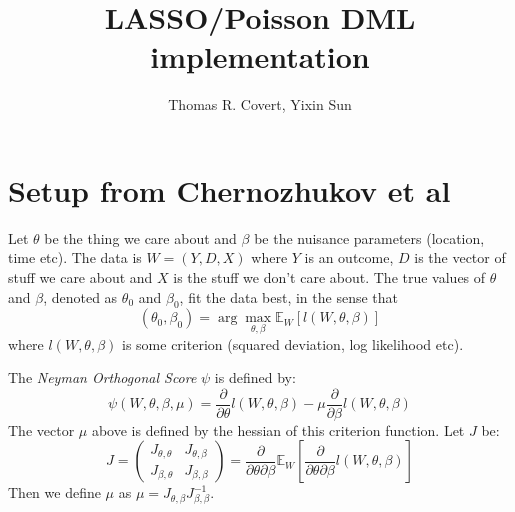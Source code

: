 \documentclass[11pt]{article}
\title{LASSO/Poisson DML implementation}
\author{Thomas R. Covert, Yixin Sun}
\begin{document}
\maketitle
\section{Setup from Chernozhukov et al}
Let $\theta$ be the thing we care about and $\beta$ be the nuisance parameters (location, time etc).  The data is $W = (Y, D, X)$ where $Y$ is an outcome, $D$ is the vector of stuff we care about and $X$ is the stuff we don't care about.  The true values of $\theta$ and $\beta$, denoted as $\theta_0$ and $\beta_0$, fit the data best, in the sense that
\begin{equation*}
	(\theta_0, \beta_0) = \arg \underset{\theta, \beta} \max \mathbb{E}_W\left[l(W, \theta, \beta)\right] 
\end{equation*}
where $l(W, \theta, \beta)$ is some criterion (squared deviation, log likelihood etc).

The \textit{Neyman Orthogonal Score} $\psi$ is defined by:
\begin{equation*}
	\psi(W, \theta, \beta, \mu) = \frac{\partial}{\partial \theta}l(W, \theta, \beta) - \mu \frac{\partial}{\partial \beta}l(W, \theta, \beta) 
\end{equation*}
The vector $\mu$ above is defined by the hessian of this criterion function.  Let $J$ be:
\begin{equation*}
	J = 
	\begin{pmatrix}
		J_{\theta, \theta} & J_{\theta, \beta} \\
		J_{\beta, \theta} & J_{\beta, \beta}	
	\end{pmatrix}
	= \frac{\partial}{\partial \theta \partial \beta} \mathbb{E}_W\left[\frac{\partial}{\partial \theta \partial \beta} l(W, \theta, \beta)\right]
\end{equation*}
Then we define $\mu$ as $\mu = J_{\theta, \beta} J_{\beta, \beta}^{-1}$.  
\end{document}
